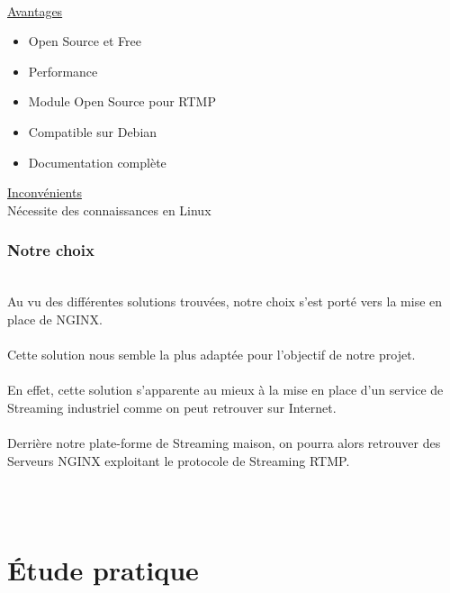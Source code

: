 \documentclass{report}
\begin{document}
    \\
    \underline{Avantages}\\
    
    \begin{itemize}
    \item Open Source et Free
    \item Performance
    \item Module Open Source pour RTMP
    \item Compatible sur Debian
    \item Documentation complète
    \end{itemize}

    \hfill{}

    \underline{Inconvénients}\\
    
    Nécessite des connaissances en Linux


    

        \subsection{Notre choix}\\
        
    Au vu des différentes solutions trouvées, notre choix s'est porté vers la mise en place de NGINX.
    \\
    \\
    Cette solution nous semble la plus adaptée pour l'objectif de notre projet.
    \\
    \\
    En effet, cette solution s'apparente au mieux à la mise en place d'un service de Streaming industriel comme on peut retrouver sur Internet.
    \\
    \\
    Derrière notre plate-forme de Streaming maison, on pourra alors retrouver des Serveurs NGINX exploitant le protocole de Streaming RTMP.
    
    
    \\
    \\


\chapter{Étude pratique}
\end{document}
